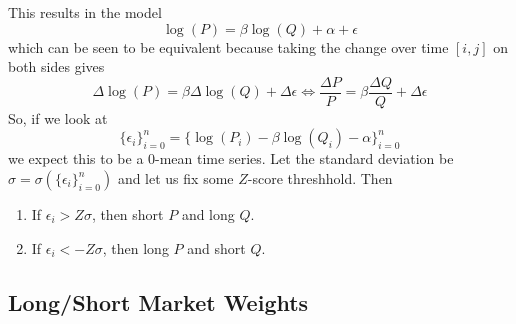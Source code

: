 \documentclass{article}
\begin{document}
  This results in the model 
  \begin{equation}
    \log(P) = \beta \log(Q) + \alpha + \epsilon
  \end{equation}
  which can be seen to be equivalent because taking the change over time $[i, j]$ on both sides gives 
  \begin{equation}
    \Delta \log(P) = \beta \Delta \log(Q) + \Delta \epsilon \iff \frac{\Delta P}{P} = \beta \frac{\Delta Q}{Q} + \Delta\epsilon 
  \end{equation}
  So, if we look at
  \begin{equation}
    \{\epsilon_i\}_{i=0}^n = \{\log(P_i) - \beta \log(Q_i) - \alpha\}_{i=0}^n 
  \end{equation}
  we expect this to be a $0$-mean time series. Let the standard deviation be $\sigma = \sigma(\{\epsilon_i\}_{i=0}^n)$ and let us fix some $Z$-score threshhold. Then 
  \begin{enumerate}
    \item If $\epsilon_i > Z \sigma$, then short $P$ and long $Q$. 
    \item If $\epsilon_i < -Z \sigma$, then long $P$ and short $Q$. 
  \end{enumerate}

  \subsection{Long/Short Market Weights}
\end{document}
